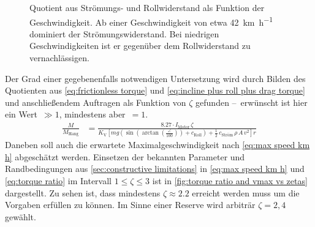 		\newpage
		\begin{figure}[h]
			\centering
			
			\caption[Quotient aus Strömungs- und Rollwiderstand als Funktion der Geschwindigkeit]{Quotient aus Strömungs- und Rollwiderstand als Funktion der Geschwindigkeit. Ab einer Geschwindigkeit von etwa \qty{42}{\kilo\metre\per\hour} dominiert der Strömungswiderstand. Bei niedrigen Geschwindigkeiten ist er gegenüber dem Rollwiderstand zu vernachlässigen.}%
			\label{fig:Froll vs Fdrag}
		\end{figure}
		Der Grad einer gegebenenfalls notwendigen Untersetzung wird durch Bilden des Quotienten aus \cref{eq:frictionless torque} und \cref{eq:incline plus roll plus drag torque} und anschließendem Auftragen als Funktion von \(\zeta\) gefunden --~erwünscht ist hier ein Wert~\(\gg 1\), mindestens aber~\(= 1\).
		\begin{align}
			\frac{M}{M_\text{Hang}} &= \frac{\num{8,27} \cdot I_\text{Motor} \, \zeta}{K_\text{V}
			\left[ m g
				\left(\sin
					\left(\arctan
						\left(
							\frac{\angle}{100}
						\right)
					\right) + c_\text{Roll}
				\right) + \frac{1}{2} \, c_\text{Ström} \, \rho \, A \, v^2
			\right] r}%
			\label{eq:torque ratio}
		\end{align}
		Daneben soll auch die erwartete Maximalgeschwindigkeit nach \cref{eq:max speed km h} abgeschätzt werden.
		Einsetzen der bekannten Parameter und Randbedingungen aus \cref{sec:constructive limitations} in \cref{eq:max speed km h} und \cref{eq:torque ratio} im Intervall \(1 \leq \zeta \leq 3\) ist in \cref{fig:torque ratio and vmax vs zetas} dargestellt.
		Zu sehen ist, dass mindestens \(\zeta \approx \num{2,2}\) erreicht werden muss um die Vorgaben erfüllen zu können.
		Im Sinne einer Reserve wird arbiträr \(\zeta = 2,4\) gewählt.
